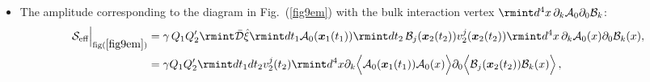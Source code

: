 \begin{itemize}
\begin{align}
\begin{split}
=\gamma Q_1Q_2'\rmint dt\, \,\Big[\rmint \frac{e^{-i\boldsymbol{k}\cdot \boldsymbol{r}}}{(\boldsymbol{k}^2+\mu^2)}\Bigg]    \,,             \\ &
=\gamma Q_1Q_2'\rmint dt\,\frac{e^{-\mu_{\gamma}r}}{4\pi r}+(1\leftrightarrow 2)\,\sim \mathcal{O}(L v^2)\,.
    \end{split}
\end{align}
\item The amplitude corresponding to the diagram in Fig.~(\ref{fig9em}) with the bulk interaction vertex $\rmint d^4x \,\partial_k\mathcal{A}_0\partial_0 \mathcal{B}_k$:
\begin{align}
    \begin{split}
   \mathcal{S}_{\text{eff}}\Big|_{\text{fig}(\ref{fig9em})}&=\gamma \,Q_1 Q_2'\rmint\Bar{\mathcal{D}}\Hat{\xi}\rmint dt_1\mathcal{A}_0(\boldsymbol{x}_1(t_1))\rmint dt_2\, \mathcal{B}_j(\boldsymbol{x}_2(t_2))v_2^j(\boldsymbol{x}_2(t_2))\rmint d^4x\,\partial_k\mathcal{A}_0(x)\partial_0\mathcal{B}_k(x),\\&=\gamma Q_1 Q_2'\rmint dt_1dt_2v_2^j(t_2)\rmint d^4x\partial_k\Big{\langle}\mathcal{A}_0(\boldsymbol{x}_1(t_1))\mathcal{A}_0(x)\Big{\rangle}\partial_0\Big{\langle}\mathcal{B}_j(\boldsymbol{x}_2(t_2))\mathcal{B}_k(x) \Big{\rangle}\,,\\ &

\end{split}
\end{align}
\end{itemize}
